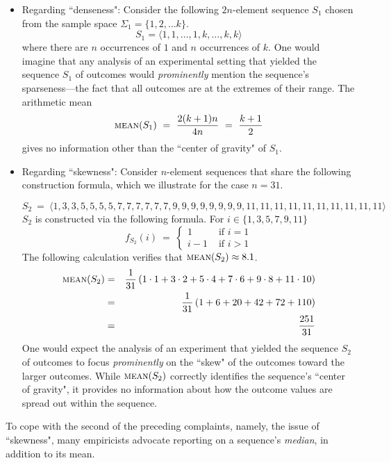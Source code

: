 \begin{itemize}
\item
Regarding ``denseness":
Consider the following $2n$-element sequence $S_1$ chosen from the sample space $\Sigma_1 = \{1, 2, \ldots k\}$.
\[ S_1 = \langle 1, 1, \ldots, 1, k, \ldots, k, k \rangle \]
where there are $n$ occurrences of $1$ and $n$ occurrences of $k$.  One would imagine that any analysis of an experimental setting that yielded the sequence $S_1$ of outcomes would {\em prominently} mention the sequence's sparseness---the fact that all outcomes are at the extremes of their range.  The arithmetic mean
\[  \mbox{\sc mean}(S_1) \ = \ \frac{2(k+1)n}{4n} \ = \ {k+1 \over 2} \]
gives no information other than the ``center of gravity" of $S_1$.

\medskip\item
Regarding ``skewness":
Consider $n$-element sequences that share the following construction formula, which we illustrate for the case $n=31$.

{\small
\[ S_2 \ = \ \langle 
1,
3,3,
5,5,5,5,
7,7,7,7,7,7,
9,9,9,9,9,9,9,9,
11,11,11,11,11,11,11,11,11,11
\rangle \]
} 
\hspace*{-.1in} $S_2$ is constructed via the following formula.  For $i \in \{1,3,5,7,9,11\}$
\[ f_{S_2}(i) \ = \ \left\{ \begin{array}{cl}
1  & \mbox{ if } i=1 \\
 i-1& \mbox{ if } i>1
\end{array}  
\right.
\]
The following calculation verifies that $\mbox{\sc mean}(S_2) \approx 8.1$. 
\begin{eqnarray*}
\mbox{\sc mean}(S_2)
 & = & 
{1 \over 31}
\left(
1 \cdot 1 +
3 \cdot 2 +
5 \cdot 4 +
7 \cdot 6 +
9 \cdot 8 +
11 \cdot 10
\right)
 \\
  & = & 
{1 \over 31}
\left(
 1 + 6 + 20 + 42 + 72 + 110
\right)
 \\
  & = & 
\frac{251}{31}
\end{eqnarray*}
One would expect the analysis of an experiment that yielded the sequence $S_2$ of outcomes to focus {\em prominently} on the ``skew" of the outcomes toward the larger outcomes.  While $\mbox{\sc mean}(S_2)$ correctly identifies the sequence's ``center of gravity", it provides no information about how the outcome values are spread out within the sequence.
\end{itemize}

\bigskip

To cope with the second of the preceding complaints, namely, the issue of ``skewness", many empiricists advocate reporting on a sequence's {\it median}, in addition to its mean.

